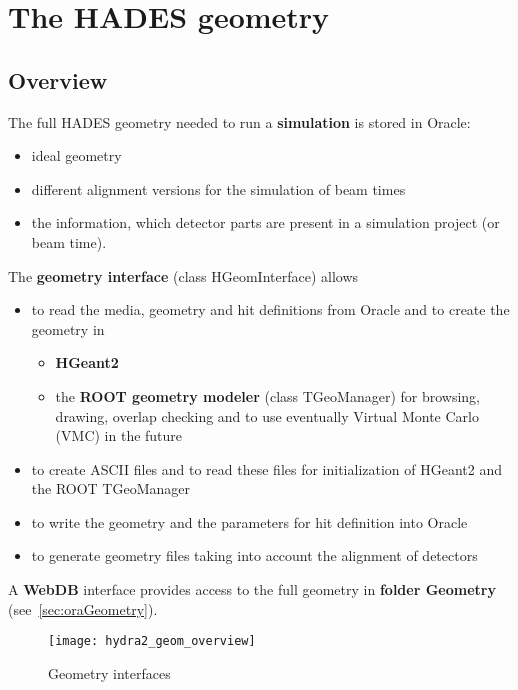 \chapter[The HADES geometry]{The HADES geometry} \label{ch:geometry}

\section[Overview]{Overview}

The full HADES geometry needed to run a \textbf{simulation} is stored in Oracle:
\begin{itemize}
  \item ideal geometry
  \item different alignment versions for the simulation of beam times
  \item the information, which detector parts are present in a simulation project (or beam time).
\end{itemize}

The \textbf{geometry interface} (class HGeomInterface) allows
\begin{itemize}
   \item to read the media, geometry and hit definitions from Oracle and to create the geometry in
   \begin{itemize}
      \item \textbf{HGeant2} 
      \item the \textbf{ROOT geometry modeler} (class TGeoManager) for browsing, drawing, overlap checking and to 
        use eventually Virtual Monte Carlo (VMC) in the future
   \end{itemize}
   \item to create ASCII files and to read these files for initialization of HGeant2 and the ROOT TGeoManager
   \item to write the geometry and the parameters for hit definition into Oracle
   \item to generate geometry files taking into account the alignment of detectors
\end{itemize}
A \textbf{WebDB} interface provides access to the full geometry in \textbf{folder Geometry} (see~\ref{sec:oraGeometry}).

\begin{figure}[\htb]
  \centering
  \texttt{[image: hydra2\_geom\_overview]}
  \caption[Geometry interfaces]{Geometry interfaces} \label{fig:geometryInterfaces}
\end{figure}

